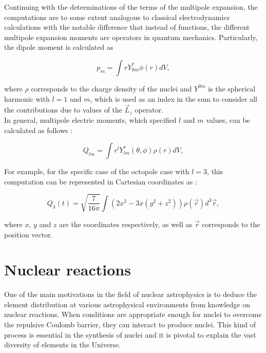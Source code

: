 \documentclass[openany]{book}
\begin{document}
Continuing with the determinations of the terms of the multipole expansion, the computations are to some extent analogous to classical electrodynamics calculations with the notable difference that instead of functions, the different multipole expansion moments are operators in quantum mechanics. Particularly, the dipole moment is calculated as

\begin{equation}\label{eq:nuclearTransitions_dipole}
	p_m = \int r Y_{0m}^{*} \phi(r) dV, 
\end{equation}

where $\rho$ corresponds to the charge density of the nuclei and $Y^{0m}$ is the spherical harmonic with $l =1$ and $m$, which is used as an index in the sum to consider all the contributions due to values of the $\vec L_z$ operator. \\

In general, multipole electric moments, which specified $l$ and $m$ values,  can be calculated as follows \cite{blatt_weisskopf_1952}: 

\begin{equation}\label{eq:nuclearTransitions_quadrupole}
	Q_{lm} = \int r^{l}Y_{lm}^{*}(\theta, \phi) \rho(r) dV, 
\end{equation}

For example, for the specific case of the octopole case with $l=3$, this computation can be represented in Cartesian coordinates as \cite{simenel_keser_umar_oberacker_2013}: 

\begin{equation}\label{micro_TDHF_quadrupole}
	Q_3(t) =  \sqrt{\frac{7}{16\pi}} \int (2x^3 -  3x(y^2 + z^2)) \rho(\vec r) d^3 \vec r,
\end{equation}

where $x$, $y$ and $z$ are the coordinates respectively, as well as $\vec r $ corresponds to the position vector.  \\


\section{Nuclear reactions} \label{sec:nuclearReactions}

One of the main motivations in the field of nuclear astrophysics is to deduce the element distribution at various astrophysical environments from knowledge on nuclear reactions. When conditions are appropriate enough for nuclei to overcome the repulsive Coulomb barrier, they can interact to produce nuclei. This kind of process is essential in the synthesis of nuclei and it is pivotal to explain the vast diversity of elements in the Universe.  \\
\end{document}
